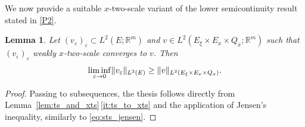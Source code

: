 \documentclass[reqno,11pt]{amsart}
\numberwithin{equation}{section}
\theoremstyle{thmlemcorr}
\numberwithin{theorem}{section}
\newtheorem{lemma}[theorem]{Lemma}
\theoremstyle{thmlemcorr*}
\theoremstyle{defi}
\theoremstyle{remexample}
\theoremstyle{ass}
\newcommand{\R}{\mathbb{R}}
\DeclarePairedDelimiter{\norm}{\lVert}{\rVert}
\newcommand{\1}{\mathds{1}}
\newcommand{\veps}{\varepsilon}
\newcommand{\dl}{\,\mathrm{d}}
\newcommand{\seq}[1]{(#1_k)_{k}}
\newcommand{\sequence}[2]{(#1_#2)_{#2}}
\begin{document}
We now provide a suitable \(x\)-two-scale variant of the lower semicontinuity result stated in \ref{P2}. 
\begin{lemma}\label{lem:x_norm_lsc}
    Let \(\sequence{v}{\veps}\subset L^2(E;\R^m)\) and \(v\in L^2(E_\xi\times E_x\times Q_x;\R^m)\) such that \(\sequence{v}{\veps}\) weakly \(x\)-two-scale converges to \(v\). Then
    \begin{equation*}
        \liminf_{\veps\to 0}\norm{v_\veps}_{L^2(E)}
        \ge \norm{v}_{L^2(E_\xi\times E_x\times Q_x)}.
    \end{equation*}
\end{lemma}
\begin{proof} Passing to subsequences, the thesis follows directly from Lemma~\ref{lem:ts_and_xts}\,\ref{it:ts_to_xts} and the application of Jensen's inequality, similarly to \eqref{eq:sts_jensen}.
\end{proof} 
\end{document}
